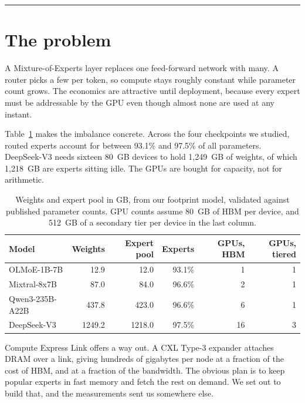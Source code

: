 \documentclass[10pt,a4paper]{article}
\begin{document}
\vspace{4pt}
\hrule
\vspace{10pt}

\section{The problem}

A Mixture-of-Experts layer replaces one feed-forward network with many. A router
picks a few per token, so compute stays roughly constant while parameter count
grows. The economics are attractive until deployment, because every expert must
be addressable by the GPU even though almost none are used at any instant.

Table~\ref{tab:footprint} makes the imbalance concrete. Across the four
checkpoints we studied, routed experts account for between 93.1\% and 97.5\% of
all parameters. DeepSeek-V3 needs sixteen 80~GB devices to hold 1{,}249~GB of
weights, of which 1{,}218~GB are experts sitting idle. The GPUs are bought for
capacity, not for arithmetic.

\begin{table}[htbp]
\centering\small
\caption{Weights and expert pool in GB, from our footprint model, validated
against published parameter counts. GPU counts assume 80~GB of HBM per device,
and 512~GB of a secondary tier per device in the last column.}
\label{tab:footprint}
\begin{tabular}{lrrrrr}
\toprule
Model & Weights & Expert pool & Experts & GPUs, HBM & GPUs, tiered \\
\midrule
OLMoE-1B-7B     & 12.9   & 12.0   & 93.1\% & 1  & 1 \\
Mixtral-8x7B    & 87.0   & 84.0   & 96.6\% & 2  & 1 \\
Qwen3-235B-A22B & 437.8  & 423.0  & 96.6\% & 6  & 1 \\
DeepSeek-V3     & 1249.2 & 1218.0 & 97.5\% & 16 & 3 \\
\bottomrule
\end{tabular}
\end{table}

Compute Express Link offers a way out. A CXL Type-3 expander attaches DRAM over a
link, giving hundreds of gigabytes per node at a fraction of the cost of HBM, and
at a fraction of the bandwidth. The obvious plan is to keep popular experts in
fast memory and fetch the rest on demand. We set out to build that, and the
measurements sent us somewhere else.
\end{document}
